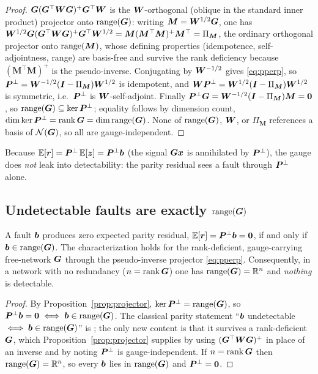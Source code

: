 \begin{proof}
$\bm{G}(\bm{G}^\top\bm{W}\bm{G})^{+}\bm{G}^\top\bm{W}$ is the $\bm{W}$-orthogonal (oblique in the
standard inner product) projector onto $\operatorname{range}(\bm{G})$: writing $\bm M=\bm{W}^{1/2}\bm{G}$, one
has $\bm{W}^{1/2}\bm{G}(\bm{G}^\top\bm{W}\bm{G})^{+}\bm{G}^\top\bm{W}^{1/2}=\bm M(\bm M^\top\bm
M)^{+}\bm M^\top=\Pi_{\bm M}$, the ordinary orthogonal projector onto $\operatorname{range}(\bm M)$, whose
defining properties (idempotence, self-adjointness, range) are basis-free and survive the
rank deficiency because $(\bm M^\top\bm M)^{+}$ is the pseudo-inverse. Conjugating by
$\bm{W}^{-1/2}$ gives \eqref{eq:pperp}, so $\bm{P}^{\perp}=\bm{W}^{-1/2}(\bm{I}-\Pi_{\bm M})\bm{W}^{1/2}$
is idempotent, and $\bm{W}\bm{P}^{\perp}=\bm{W}^{1/2}(\bm{I}-\Pi_{\bm M})\bm{W}^{1/2}$ is symmetric,
i.e.\ $\bm{P}^{\perp}$ is $\bm{W}$-self-adjoint. Finally $\bm{P}^{\perp}\bm{G}=\bm{W}^{-1/2}(\bm{I}-\Pi_{\bm
M})\bm M=\bm0$, so $\operatorname{range}(\bm{G})\subseteq\ker\bm{P}^{\perp}$; equality follows by dimension count,
$\dim\ker\bm{P}^{\perp}=\operatorname{rank}\bm{G}=\dim\operatorname{range}(\bm{G})$. None of $\operatorname{range}(\bm{G})$, $\bm{W}$, or $\Pi_{\bm
M}$ references a basis of $\mathcal{N}(\bm{G})$, so all are gauge-independent.
\end{proof}

Because $\mathbb E[\bm r]=\bm{P}^{\perp}\,\mathbb E[\bm z]=\bm{P}^{\perp}\bm{b}$ (the signal $\bm{G}\bm{x}$ is
annihilated by $\bm{P}^{\perp}$), the gauge does \emph{not} leak into detectability: the parity
residual sees a fault through $\bm{P}^{\perp}$ alone.

\subsection{Undetectable faults are exactly \texorpdfstring{$\operatorname{range}(\bm{G})$}{range(G)}}
\label{sec:undetectable}

\begin{theorem}
\label{thm:undetectable}
A fault $\bm{b}$ produces zero expected parity residual, $\mathbb E[\bm r]=\bm{P}^{\perp}\bm{b}=\bm0$,
if and only if $\bm{b}\in\operatorname{range}(\bm{G})$. The characterization holds for the rank-deficient,
gauge-carrying free-network $\bm{G}$ through the pseudo-inverse projector \eqref{eq:pperp}.
Consequently, in a network with no redundancy ($n=\operatorname{rank}\bm{G}$) one has $\operatorname{range}(\bm{G})=\mathbb{R}^{n}$
and \emph{nothing} is detectable.
\end{theorem}

\begin{proof}
By Proposition~\ref{prop:projector}, $\ker\bm{P}^{\perp}=\operatorname{range}(\bm{G})$, so $\bm{P}^{\perp}\bm{b}=\bm0\iff
\bm{b}\in\operatorname{range}(\bm{G})$. The classical parity statement ``$\bm{b}$ undetectable
$\iff\bm{b}\in\operatorname{range}(\bm{G})$'' is \Cited{} \citep{sturza1988,brown1992,parkinson1988}; the only
new content is that it survives a rank-deficient $\bm{G}$, which Proposition~\ref{prop:projector}
supplies by using $(\bm{G}^\top\bm{W}\bm{G})^{+}$ in place of an inverse and by noting $\bm{P}^{\perp}$
is gauge-independent. If $n=\operatorname{rank}\bm{G}$ then $\operatorname{range}(\bm{G})=\mathbb{R}^{n}$, so every $\bm{b}$ lies in
$\operatorname{range}(\bm{G})$ and $\bm{P}^{\perp}=\bm0$.
\end{proof}

